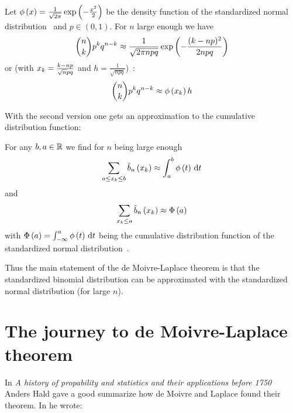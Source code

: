 \begin{theorem}
  Let $\phi\left( {x} \right)=\frac{1}{\sqrt{2\pi}}\exp\left( {-\frac{x^2}2} \right)$ be the density function of the standardized normal distribution~\cite[p. 48]{georgii} and $p\in(0,1)$. For $n$ large enough we have~\cite[p. 65]{irle}
  \begin{align}
    \binom nk p^k q^{n-k} \approx \frac 1{\sqrt{2\pi npq}} \exp\left( {-\frac{(k-np)^2}{2npq}} \right)
  \end{align}
  or (with $x_{k}=\frac{k-np}{\sqrt npq}$ and $h=\frac1{\sqrt{npq}}$)~\cite[p. 133]{georgii}:
  \begin{align}
    \binom nk p^k q^{n-k} \approx \phi\left( {x_{k}} \right) h
  \end{align}
\end{theorem}

\noindent With the second version one gets an approximation to the cumulative distribution function:


\begin{theorem}
  For any $b,a \in \mathbb R$ we find for $n$ being large enough~\cite[p. 136]{georgii}\cite[p. 67]{irle}
  \begin{align}
    \sum_{a \le x_{k}\le b} \tilde b_{n}\left({x_{k}}\right) \approx \int_a^b \phi\left( {t} \right) \,\mathrm d{t}
  \end{align}
  and
  \begin{align}
    \sum_{x_{k} \le a} \tilde b_{n}\left({x_{k}}\right) \approx \Phi\left( {a} \right)
  \end{align}
  with $\Phi\left( {a} \right) = \int_{-\infty}^a \phi\left( {t} \right) \,\mathrm d{t}$ being the cumulative distribution function of the standardized normal distribution~\cite[p. 134]{georgii}.
\end{theorem}

Thus the main statement of the de Moivre-Laplace theorem is that the standardized binomial distribution can be approximated with the standardized normal distribution (for large $n$).

\section{The journey to de Moivre-Laplace theorem}

In \emph{A history of propability and statistics and their applications before 1750} Anders Hald gave a good summarize how de Moivre and Laplace found their theorem. In \cite[pp. 469-470]{hald1} he wrote:

